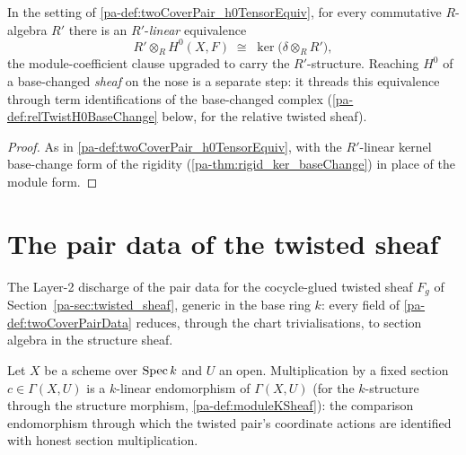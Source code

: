 \begin{definition}
  \label{pa-def:twoCoverPair_h0BaseChangeEquiv}
  \leanok

  In the setting of \ref{pa-def:twoCoverPair_h0TensorEquiv}, for every commutative
  \(R\)-algebra \(R'\) there is an \(R'\)-\emph{linear} equivalence
  \[
    R' \otimes_R H^0(X, F) \;\cong\; \ker\bigl(\delta \otimes_R R'\bigr),
  \]
  the module-coefficient clause upgraded to carry the \(R'\)-structure. Reaching
  \(H^0\) of a base-changed \emph{sheaf} on the nose is a separate step: it threads
  this equivalence through term identifications of the base-changed complex
  (\ref{pa-def:relTwistH0BaseChange} below, for the relative twisted sheaf).
\end{definition}
\begin{proof}
  \leanok
  As in \ref{pa-def:twoCoverPair_h0TensorEquiv}, with the \(R'\)-linear kernel base-change
  form of the rigidity (\ref{pa-thm:rigid_ker_baseChange}) in place of the module form.
\end{proof}

\section{The pair data of the twisted sheaf}
\label{pa-sec:twist_pair_data}

The Layer-2 discharge of the pair data for the cocycle-glued twisted sheaf \(F_g\) of
Section~\ref{pa-sec:twisted_sheaf}, generic in the base ring \(k\): every field of
\ref{pa-def:twoCoverPairData} reduces, through the chart trivialisations, to section
algebra in the structure sheaf.

\begin{definition}
  \label{pa-def:mulSectionEnd}
  \leanok

  Let \(X\) be a scheme over \(\operatorname{Spec} k\) and \(U\) an open. Multiplication by a fixed
  section \(c \in \Gamma(X, U)\) is a \(k\)-linear endomorphism of \(\Gamma(X, U)\)
  (for the \(k\)-structure through the structure morphism, \ref{pa-def:moduleKSheaf}):
  the comparison endomorphism through which the twisted pair's coordinate actions are
  identified with honest section multiplication.
\end{definition}

